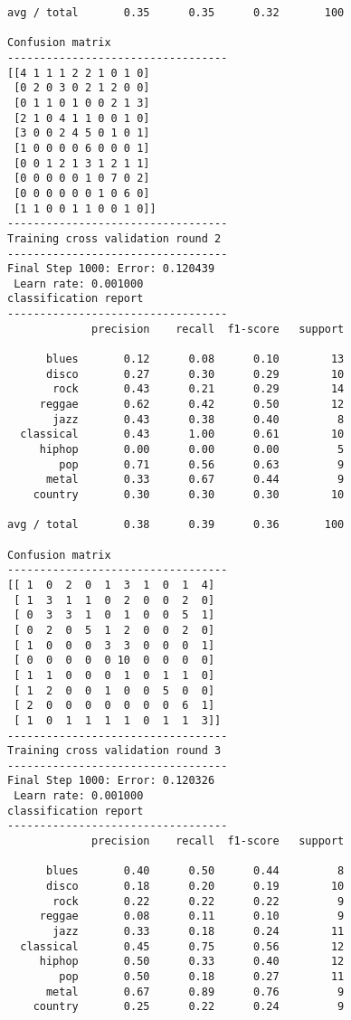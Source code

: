 \documentclass{article}
\begin{document}
\begin{Verbatim}[commandchars=\\\{\}]
avg / total       0.35      0.35      0.32       100

Confusion matrix
----------------------------------
[[4 1 1 1 2 2 1 0 1 0]
 [0 2 0 3 0 2 1 2 0 0]
 [0 1 1 0 1 0 0 2 1 3]
 [2 1 0 4 1 1 0 0 1 0]
 [3 0 0 2 4 5 0 1 0 1]
 [1 0 0 0 0 6 0 0 0 1]
 [0 0 1 2 1 3 1 2 1 1]
 [0 0 0 0 0 1 0 7 0 2]
 [0 0 0 0 0 0 1 0 6 0]
 [1 1 0 0 1 1 0 0 1 0]]
----------------------------------
Training cross validation round 2
----------------------------------
Final Step 1000: Error: 0.120439 
 Learn rate: 0.001000
classification report 
----------------------------------
             precision    recall  f1-score   support

      blues       0.12      0.08      0.10        13
      disco       0.27      0.30      0.29        10
       rock       0.43      0.21      0.29        14
     reggae       0.62      0.42      0.50        12
       jazz       0.43      0.38      0.40         8
  classical       0.43      1.00      0.61        10
     hiphop       0.00      0.00      0.00         5
        pop       0.71      0.56      0.63         9
      metal       0.33      0.67      0.44         9
    country       0.30      0.30      0.30        10

avg / total       0.38      0.39      0.36       100

Confusion matrix
----------------------------------
[[ 1  0  2  0  1  3  1  0  1  4]
 [ 1  3  1  1  0  2  0  0  2  0]
 [ 0  3  3  1  0  1  0  0  5  1]
 [ 0  2  0  5  1  2  0  0  2  0]
 [ 1  0  0  0  3  3  0  0  0  1]
 [ 0  0  0  0  0 10  0  0  0  0]
 [ 1  1  0  0  0  1  0  1  1  0]
 [ 1  2  0  0  1  0  0  5  0  0]
 [ 2  0  0  0  0  0  0  0  6  1]
 [ 1  0  1  1  1  1  0  1  1  3]]
----------------------------------
Training cross validation round 3
----------------------------------
Final Step 1000: Error: 0.120326 
 Learn rate: 0.001000
classification report 
----------------------------------
             precision    recall  f1-score   support

      blues       0.40      0.50      0.44         8
      disco       0.18      0.20      0.19        10
       rock       0.22      0.22      0.22         9
     reggae       0.08      0.11      0.10         9
       jazz       0.33      0.18      0.24        11
  classical       0.45      0.75      0.56        12
     hiphop       0.50      0.33      0.40        12
        pop       0.50      0.18      0.27        11
      metal       0.67      0.89      0.76         9
    country       0.25      0.22      0.24         9


\end{Verbatim}
\end{document}
